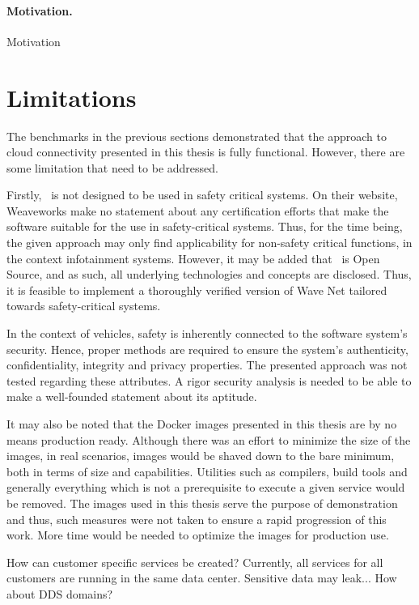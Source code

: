 \paragraph{Motivation.} Motivation

%
%
%
%
%
%
%
%
%
%


\section{Limitations}

The benchmarks in the previous sections demonstrated that the approach to cloud connectivity presented in this thesis is fully functional. However, there are some limitation that need to be addressed.

Firstly, \wnet\ is not designed to be used in safety critical systems. On their website, Weaveworks make no statement about any certification efforts that make the software suitable for the use in safety-critical systems. Thus, for the time being, the given approach may only find applicability for non-safety critical functions, \eg in the context infotainment systems. However, it may be added that \wnet\ is Open Source, and as such, all underlying technologies and concepts are disclosed. Thus, it is feasible to implement a thoroughly verified version of Wave Net tailored towards safety-critical systems.

In the context of vehicles, safety is inherently connected to the software system's security. Hence, proper methods are required to ensure the system's authenticity, confidentiality, integrity and privacy properties. The presented approach was not tested regarding these attributes. A rigor security analysis is needed to be able to make a well-founded statement about its aptitude.

It may also be noted that the Docker images presented in this thesis are by no means production ready. Although there was an effort to minimize the size of the images, in real scenarios, images would be shaved down to the bare minimum, both in terms of size and capabilities. Utilities such as compilers, build tools and generally everything which is not a prerequisite to execute a given service would be removed. The images used in this thesis serve the purpose of demonstration and thus, such measures were not taken to ensure a rapid progression of this work. More time would be needed to optimize the images for production use.


How can customer specific services be created? Currently, all services for all customers are running in the same data center. Sensitive data may leak... How about DDS domains?

%
%
%
%
%
%
%
%
%
%
%
%
%
%
%
%
%
%
%
%
%
%
%
%
%
%
%
%
%
%
%
%